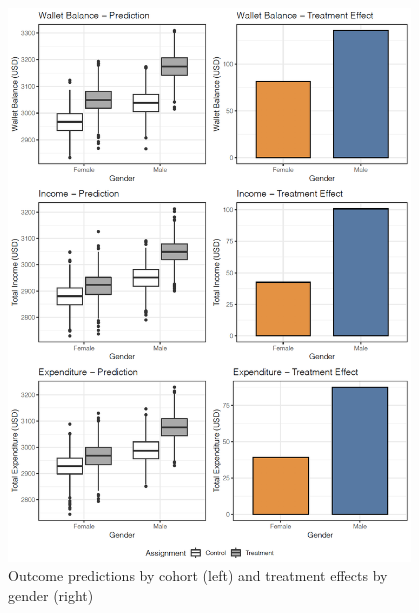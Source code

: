 \documentclass[12pt]{article}
\begin{document}
\begin{figure}[H]
    \centering
    \includegraphics[width=0.95\textwidth]{figures/fig_8}
    \caption{Outcome predictions by cohort (left) and treatment effects by gender (right)}
    \label{fig:fig8}
\end{figure}
\end{document}
